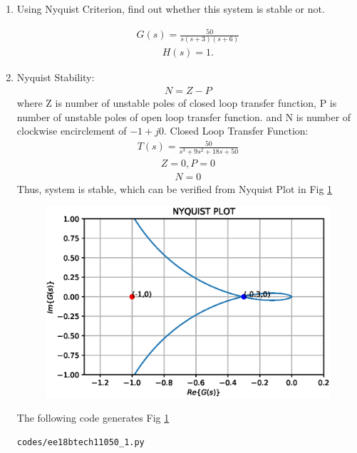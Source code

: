 \begin{enumerate}[label=\thesection.\arabic*.,ref=\thesection.\theenumi]
\item Using Nyquist Criterion, find out whether this system is stable or not.

\begin{align}
    G(s) = \frac{50}{s(s+3)(s+6)}
    \label{eq:ee18btech11050_1}
\end{align}
\begin{align}
    H(s) = 1.
    \label{eq:ee18btech11050_2}
\end{align}

\item \solution

Nyquist Stability:
\begin{align}
    N = Z -P
\end{align}
where Z is number of unstable poles of closed loop transfer function, P is number of unstable poles of open loop transfer function.
and N is number of clockwise encirclement of $-1+j0.$
Closed Loop Transfer Function:
\begin{align}
    T(s) = \frac{50}{s^3+9s^2+18s+50}
\end{align}
\begin{align}
    Z = 0, P = 0
\end{align}
\begin{align}
    N = 0
\end{align}
Thus, system is stable, which can be verified from Nyquist Plot in Fig \ref{fig:ee18btech11050_fig1}

\begin{figure}[!ht]
\centering
\includegraphics[width=\columnwidth]{./figs/ee18btech11050_1.eps}
\caption{}
\label{fig:ee18btech11050_fig1}
\end{figure}

The following code generates Fig \ref{fig:ee18btech11050_fig1}
\begin{lstlisting}
codes/ee18btech11050_1.py
\end{lstlisting}

\end{enumerate}
